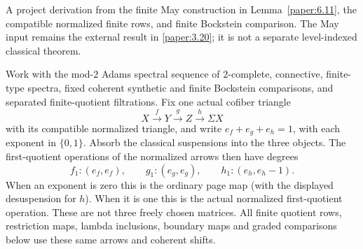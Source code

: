 \begin{theorem}
\label{sem:ProofTools:ml-finite-core}
A project derivation from the finite May construction in
Lemma~\ref{paper:6.11}, the compatible normalized finite rows, and finite
Bockstein comparison. The May input remains the external result in
\ref{paper:3.20}; it is not a separate level-indexed classical theorem.\par
Work with the mod-$2$ Adams spectral sequence of $2$-complete, connective,
finite-type spectra, fixed coherent synthetic and finite Bockstein comparisons,
and separated finite-quotient filtrations.
Fix one actual cofiber triangle
\[
 X\xrightarrow fY\xrightarrow gZ\xrightarrow h\Sigma X
\]
with its compatible normalized triangle, and write
$e_f+e_g+e_h=1$, with each exponent in $\{0,1\}$.
Absorb the classical suspensions into the three objects. The first-quotient
operations of the normalized arrows then have degrees
\[
 f_1:(e_f,e_f),\qquad g_1:(e_g,e_g),\qquad h_1:(e_h,e_h-1).
\]
When an exponent is zero this is the ordinary page map (with the displayed
desuspension for $h$). When it is one this is the actual normalized
first-quotient operation. These are not three freely chosen matrices.
All finite quotient rows, restriction maps, lambda inclusions, boundary
maps and graded comparisons below use these same arrows and coherent shifts.


\end{theorem}
